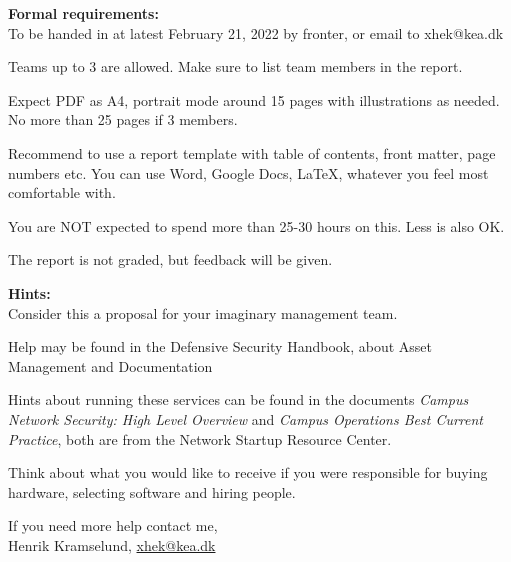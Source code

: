 \documentclass[a4paper,11pt,notitlepage,landscape]{report}
\begin{document}
{\bf Formal requirements:}\\
To be handed in at latest February 21, 2022 by fronter, or email to xhek@kea.dk

Teams up to 3 are allowed. Make sure to list team members in the report.

Expect PDF as A4, portrait mode around 15 pages with illustrations as needed.
No more than 25 pages if 3 members.

Recommend to use a report template with table of contents, front matter, page numbers etc. You can use Word, Google Docs, \LaTeX, whatever you feel most comfortable with.

You are NOT expected to spend more than 25-30 hours on this. Less is also OK.

The report is not graded, but feedback will be given.

{\bf Hints:}\\
Consider this a proposal for your imaginary management team.

Help may be found in the Defensive Security Handbook, about Asset Management and Documentation

Hints about running these services can be found in the documents \emph{Campus Network Security: High Level Overview} and \emph{Campus Operations Best Current Practice}, both are from the Network Startup Resource Center.

Think about what you would like to receive if you were responsible for buying hardware, selecting software and hiring people.

If you need more help contact me,\\


Henrik Kramselund, \url{xhek@kea.dk}
\end{document}
